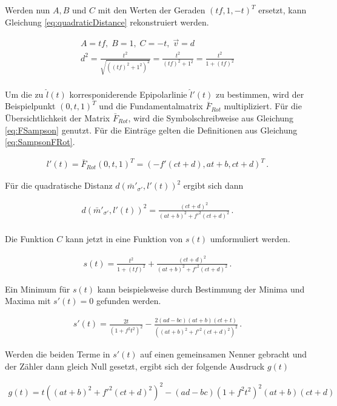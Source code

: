 Werden nun $A,B$ und $C$ mit den Werten der Geraden $(tf,1,-t)^T$ ersetzt, kann Gleichung \ref{eq:quadraticDistance} rekonstruiert werden.

\begin{gather}
	A = tf, \; B= 1, \; C = -t, \; \vec{v} = d\\
	d^2 = \frac{t^2}{\sqrt{((tf)^2+1^2)^2}} = \frac{t^2}{(tf)^2+ 1^2} =  \frac{t^2}{1 + (tf)^2}
\end{gather}\\

Um die zu $\hat{l}(t)$ korresponiderende Epipolarlinie $\hat{l}'(t)$ zu bestimmen, wird der Beispielpunkt $(0,t,1)^T$ und die Fundamentalmatrix $\bar{F}_{Rot}$ multipliziert. Für die Übersichtlichkeit der Matrix  $\bar{F}_{Rot}$, wird die Symbolschreibweise aus Gleichung \ref{eq:FSampson} genutzt. Für die Einträge gelten die Definitionen aus Gleichung \ref{eq:SampsonFRot}.

\begin{gather}
	l'(t) = \bar{F}_{Rot}(0,t,1)^T = (-f'(ct+d),at+b,ct+d)^T \, .
\end{gather}

Für die quadratische Distanz $d(\bar{m}'_{\sigma'},l'(t))^2$ ergibt sich dann

\begin{gather}
	d(\bar{m}'_{\sigma'},l'(t))^2 = \frac{(ct + d)^2}{(at+b)^2+f'^2(ct+d)^2} \, .
\end{gather} \\

Die Funktion $C$ kann jetzt in eine Funktion von $s(t)$ umformuliert werden.

\begin{gather}
	s(t) = \frac{t^2}{1+(tf)^2} + \frac{(ct + d)^2}{(at+b)^2+f'^2(ct+d)^2} \, .
\end{gather}

Ein Minimum für $s(t)$ kann beispielsweise durch Bestimmung der Minima und Maxima mit $s'(t) = 0$ gefunden werden. 

\begin{gather}
	s'(t) = \frac{2t}{(1+f^2t^2)^2} - \frac{2(ad-bc)(at+b)(ct+t)}{((at+b)^2+f'^2(ct+d)^2)^2} \, .
\end{gather}

Werden die beiden Terme in $s'(t)$ auf einen gemeinsamen Nenner gebracht und der Zähler dann gleich Null gesetzt, ergibt sich der folgende Ausdruck $g(t)$\cite{HZ}

\begin{gather}
	g(t) = t((at+b)^2+f'^2(ct+d)^2)^2-(ad-bc)(1+f^2t^2)^2(at+b)(ct+d)
\end{gather}


